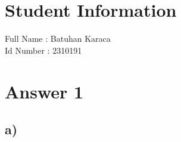 \documentclass[11pt]{article}
\begin{document}
\section*{Student Information } 
Full Name : Batuhan Karaca \\
Id Number : 2310191 \\


\section*{Answer 1}
\subsection*{a)}

    
\end{document}
